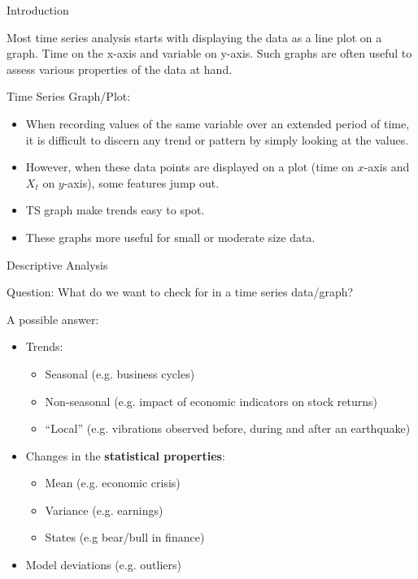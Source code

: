 \documentclass[envcountsect,usenames,dvipsnames]{beamer}
\theoremstyle{mystyle}
\begin{document}
\begin{frame}{Introduction}

\begin{Definition}
	Most time series analysis starts with displaying the data as a line plot on a graph. Time on the x-axis and variable on y-axis. Such graphs are often useful to assess various properties of the data at hand.
\end{Definition}

	\begin{exampleblock}{Time Series Graph/Plot:} 
		\begin{itemize}
			\item When recording values of the same variable over an extended period of time, it is difficult to discern any trend or pattern by simply looking at the values.
			\item However, when these data points are displayed on a plot (time on $x$-axis and $X_{t}$ on $y$-axis), some features jump out.
			\item TS graph make trends easy to spot.
			\item These graphs more useful for small or moderate size data.
		\end{itemize}

	\end{exampleblock}
\end{frame}


\begin{frame}{Descriptive Analysis}
	\begin{alertblock}{Question:}
		What do we want to check for in a time series data/graph?
	\end{alertblock}
	
	\begin{block}{A possible answer:}
		\begin{itemize}
			\item Trends:
			\begin{itemize}
				\item Seasonal (e.g. business cycles)
				\item Non-seasonal (e.g. impact of economic indicators on stock returns)
				\item ``Local'' (e.g. vibrations observed before, during and after an earthquake)
			\end{itemize}
			\item Changes in the {\color{beamer@myorange} \textbf{statistical properties}}:
			\begin{itemize}
				\item Mean (e.g. economic crisis)
				\item Variance (e.g. earnings)
				\item States (e.g bear/bull in finance)
			\end{itemize}
			\item Model deviations (e.g. outliers)
		\end{itemize}
	\end{block}
\end{frame}
\end{document}
